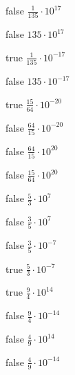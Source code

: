 \begin{reponses}
    \item[false] $\frac{1}{135}\cdot 10^{17}$
    \item[false] $135\cdot 10^{17}$
    \item[true] $\frac{1}{135}\cdot 10^{-17}$
    \item[false] $135\cdot 10^{-17}$
\end{reponses}

\begin{question}{1211}{Calcul}{0{{/}
    Que vaut $\frac{9\cdot 10^{2}\times 5\cdot 10^{-7}\times 1\cdot 10^{-7}}{4\cdot 10^{-5}\times 2\cdot 10^{3}\times 4\cdot 10^{4}\times 6\cdot 10^{6}}$?
\end{question}

\begin{reponses}
    \item[true] $\frac{15}{64}\cdot 10^{-20}$
    \item[false] $\frac{64}{15}\cdot 10^{-20}$
    \item[false] $\frac{64}{15}\cdot 10^{20}$
    \item[false] $\frac{15}{64}\cdot 10^{20}$
\end{reponses}

\begin{question}{1211}{Calcul}{0{{/}
    Que vaut $\frac{1\cdot 10^{9}\times 5\cdot 10^{-8}\times 3\cdot 10^{-8}}{9\cdot 10^{0}}$?
\end{question}

\begin{reponses}
    \item[false] $\frac{5}{3}\cdot 10^{7}$
    \item[false] $\frac{3}{5}\cdot 10^{7}$
    \item[false] $\frac{3}{5}\cdot 10^{-7}$
    \item[true] $\frac{5}{3}\cdot 10^{-7}$
\end{reponses}

\begin{question}{1211}{Calcul}{0{{/}
    Que vaut $\frac{1\cdot 10^{-8}\times 9\cdot 10^{5}\times 4\cdot 10^{4}\times 9\cdot 10^{-5}}{6\cdot 10^{-7}\times 8\cdot 10^{-2}\times 3\cdot 10^{6}\times 1\cdot 10^{-8}\times 1\cdot 10^{-7}}$?
\end{question}

\begin{reponses}
    \item[true] $\frac{9}{4}\cdot 10^{14}$
    \item[false] $\frac{9}{4}\cdot 10^{-14}$
    \item[false] $\frac{4}{9}\cdot 10^{14}$
    \item[false] $\frac{4}{9}\cdot 10^{-14}$
\end{reponses}

